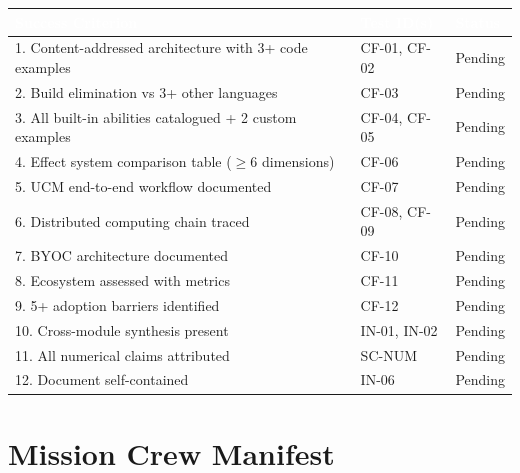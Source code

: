 \documentclass[11pt,letterpaper]{article}
\newcommand{\tableheader}[1]{\textbf{\sffamily\textcolor{white}{#1}}}
\begin{document}
\begin{center}
\begin{tabularx}{\textwidth}{XL{3cm}C{1.5cm}}
\toprule
{}
\tableheader{Success Criterion} & \tableheader{Test ID(s)} & \tableheader{Status} \\
. Content-addressed architecture with 3+ code examples & CF-01, CF-02 & Pending \\
2. Build elimination vs 3+ other languages & CF-03 & Pending \\
3. All built-in abilities catalogued + 2 custom examples & CF-04, CF-05 & Pending \\
4. Effect system comparison table ($\geq$6 dimensions) & CF-06 & Pending \\
5. UCM end-to-end workflow documented & CF-07 & Pending \\
6. Distributed computing chain traced & CF-08, CF-09 & Pending \\
7. BYOC architecture documented & CF-10 & Pending \\
8. Ecosystem assessed with metrics & CF-11 & Pending \\
9. 5+ adoption barriers identified & CF-12 & Pending \\
10. Cross-module synthesis present & IN-01, IN-02 & Pending \\
11. All numerical claims attributed & SC-NUM & Pending \\
12. Document self-contained & IN-06 & Pending \\
\bottomrule
\end{tabularx}
\end{center}

\section{Mission Crew Manifest}
\end{document}
